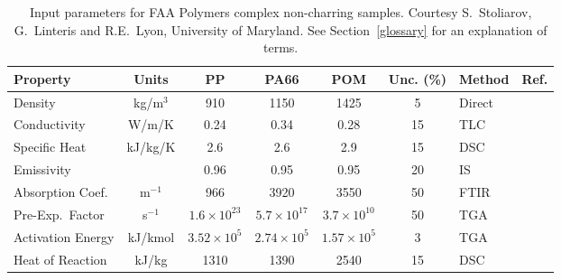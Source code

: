 \begin{table}[h!]
\caption[FAA complex non-charring polymer properties.]{Input parameters for FAA Polymers complex non-charring samples. Courtesy S.~Stoliarov, G.~Linteris and R.E.~Lyon, University of Maryland.
See Section~\ref{glossary} for an explanation of terms.}
\begin{center}
\begin{tabular}{|l|c|c|c|c|c|l|l|}
\hline
Property                    & Units         & PP                 & PA66                  & POM                 & Unc. (\%) & Method                &  Ref.                         \\ \hline \hline
Density                     & kg/m$^3$      & 910                   & 1150                   & 1425                 & 5         & Direct                &  \cite{Stoliarov:FM2012}      \\ \hline
Conductivity                & W/m/K         & 0.24                  & 0.34                  & 0.28                 & 15        & TLC                   &  \cite{Stoliarov:FM2012}      \\ \hline
Specific Heat               & kJ/kg/K       & 2.6                  & 2.6                   & 2.9                   & 15        & DSC                   &  \cite{Stoliarov:FM2012}     \\ \hline
Emissivity                  &               & 0.96                  & 0.95                  & 0.95                 & 20        & IS                    &  \cite{Stoliarov:FM2012}       \\ \hline
Absorption Coef.            & m$^{-1}$      & 966                  & 3920                  & 3550                 & 50        & FTIR                  &  \cite{Stoliarov:FM2012}   \\ \hline
Pre-Exp.~Factor             & s$^{-1}$      & $1.6 \times 10^{23}$  & $5.7 \times 10^{17}$  & $3.7 \times 10^{10}$  & 50        & TGA                   &  \cite{Stoliarov:FM2012}      \\ \hline
Activation Energy           & kJ/kmol       & $3.52 \times 10^{5}$  & $2.74 \times 10^{5}$  & $1.57 \times 10^{5}$  & 3         & TGA                   &  \cite{Stoliarov:FM2012}      \\ \hline
Heat of Reaction            & kJ/kg         & 1310                  & 1390                  & 2540                  & 15        & DSC                   &  \cite{Stoliarov:FM2012}     \\ \hline
\end{tabular}
\end{center}
\label{FAA_Properties2}
\end{table}



